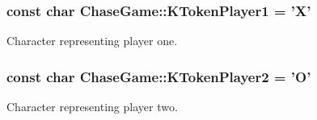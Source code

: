\hypertarget{namespace_chase_game_a8452e2d6de618e4ca7a9f76b082b52a4}{
\subsubsection[{K\-Token\-Player1}]{\setlength{\rightskip}{0pt plus 5cm}const char Chase\-Game\-::\-K\-Token\-Player1 = 'X'}}\label{namespace_chase_game_a8452e2d6de618e4ca7a9f76b082b52a4}


Character representing player one. 

\hypertarget{namespace_chase_game_ae27343407c21a8d6e3cf26b736bd5527}{
\subsubsection[{K\-Token\-Player2}]{\setlength{\rightskip}{0pt plus 5cm}const char Chase\-Game\-::\-K\-Token\-Player2 = 'O'}}\label{namespace_chase_game_ae27343407c21a8d6e3cf26b736bd5527}


Character representing player two. 

